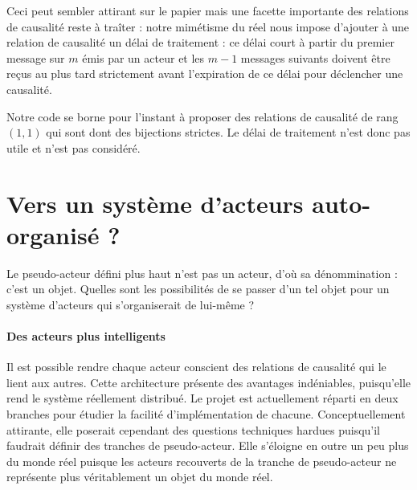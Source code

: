 \documentclass[11pt]{article}
\begin{document}
Ceci peut sembler attirant sur le papier mais une facette importante des relations de causalité reste à traîter : notre mimétisme du réel nous impose d'ajouter à une relation de causalité un délai de traitement : ce délai court à partir du premier message sur $m$ émis par un acteur et les $m - 1$ messages suivants doivent être reçus au plus tard strictement avant l'expiration de ce délai pour déclencher une causalité.

Notre code se borne pour l'instant à proposer des relations de causalité de rang $(1, 1)$ qui sont dont des bijections strictes. Le délai de traitement n'est donc pas utile et n'est pas considéré.

\section{Vers un système d'acteurs auto-organisé ?}\label{auto}

Le pseudo-acteur défini plus haut n'est pas un acteur, d'où sa dénommination : c'est un objet. Quelles sont les possibilités de se passer d'un tel objet pour un système d'acteurs qui s'organiserait de lui-même ?

\paragraph{Des acteurs plus intelligents} Il est possible rendre chaque acteur conscient des relations de causalité qui le lient aux autres. Cette architecture présente des avantages indéniables, puisqu'elle rend le système réellement distribué. Le projet est actuellement réparti en deux branches pour étudier la facilité d'implémentation de chacune. Conceptuellement attirante, elle poserait cependant des questions techniques hardues puisqu'il faudrait définir des \og tranches \fg{} de pseudo-acteur. Elle s'éloigne en outre un peu plus du monde réel puisque les acteurs recouverts de la tranche de pseudo-acteur ne représente plus véritablement un objet du monde réel.
\end{document}

